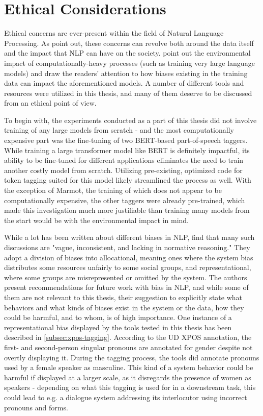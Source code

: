 \section{Ethical Considerations}
\label{sec:ethicalcons}

Ethical concerns are ever-present within the field of Natural Language Processing. As \citet{hovy-spruit-2016-social} point out, these concerns can revolve both around the data itself and the impact that NLP can have on the society. \citet{stochastic-parrots} point out the environmental impact of computationally-heavy processes (such as training very large language models) and draw the readers' attention to how biases existing in the training data can impact the aforementioned models. A number of different tools and resources were utilized in this thesis, and many of them deserve to be discussed from an ethical point of view.

To begin with, the experiments conducted as a part of this thesis did not involve training of any large models from scratch - and the most computationally expensive part was the fine-tuning of two BERT-based part-of-speech taggers. While training a large transformer model like BERT is definitely impactful, its ability to be fine-tuned for different applications eliminates the need to train another costly model from scratch. Utilizing pre-existing, optimized code for token tagging suited for this model likely streamlined the process as well. With the exception of Marmot, the training of which does not appear to be computationally expensive, the other taggers were already pre-trained, which made this investigation much more justifiable than training many models from the start would be with the environmental impact in mind. 

While a lot has been written about different biases in NLP, \citet{blodgett-etal-2020-language} find that many such discussions are "vague, inconsistent, and lacking in normative reasoning." They adopt a division of biases into allocational, meaning ones where the system bias distributes some resources unfairly to some social groups, and representational, where some groups are misrepresented or omitted by the system. The authors present recommendations for future work with bias in NLP, and while some of them are not relevant to this thesis, their suggestion to explicitly state what behaviors and what kinds of biases exist in the system or the data, how they could be harmful, and to whom, is of high importance. One instance of a representational bias displayed by the tools tested in this thesis has been described in \autoref{subsec:xpos-tagging}. According to the UD XPOS annotation, the first- and second-person singular pronouns are annotated for gender despite not overtly displaying it. During the tagging process, the tools did annotate pronouns used by a female speaker as masculine. This kind of a system behavior could be harmful if displayed at a larger scale, as it disregards the presence of women as speakers - depending on what this tagging is used for in a downstream task, this could lead to e.g. a dialogue system addressing its interlocutor using incorrect pronouns and forms. 

